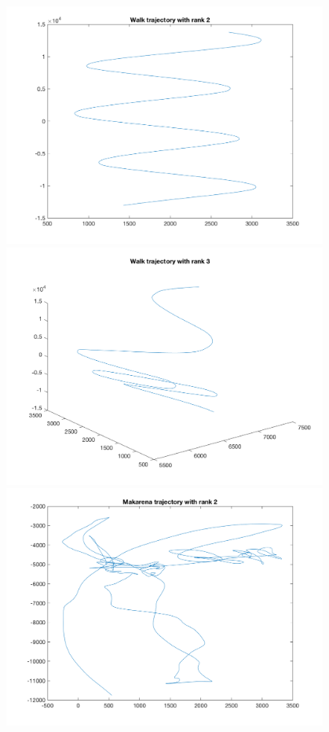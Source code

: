 \begin{enumerate}
    \begin{center}
        \includegraphics[width=0.8\textwidth]{../walk-r2.png}
        \includegraphics[width=0.8\textwidth]{../walk-r3.png}
        \includegraphics[width=0.8\textwidth]{../makarena-r2.png}

\end{center}
\end{enumerate}

